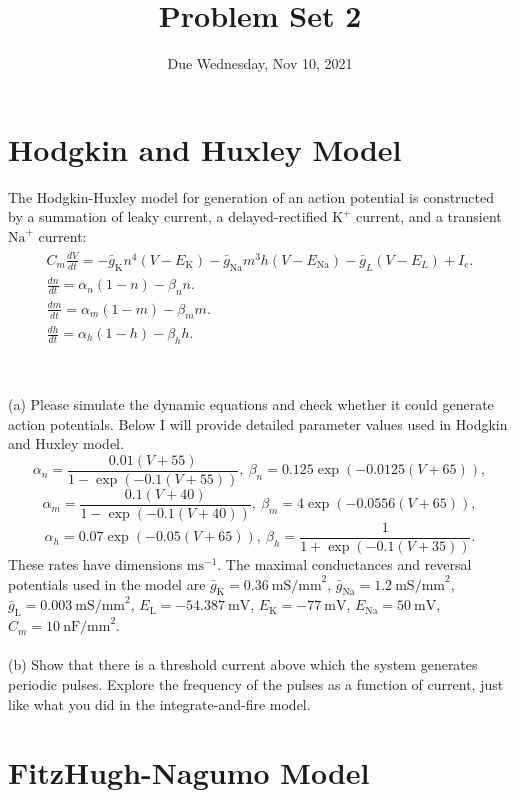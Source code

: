 \documentclass{article}
\title{Problem Set 2}
\date{Due Wednesday, Nov 10, 2021}
\begin{document}
\maketitle


\section*{Hodgkin and Huxley Model}

The Hodgkin-Huxley model for generation of an action potential is constructed by a summation of leaky current, a delayed-rectified $\textrm{K}^{+}$ current, and a transient $\textrm{Na}^{+}$ current:
\begin{eqnarray}
\begin{aligned}
C_{m}\frac{dV}{dt}=-\bar{g}_{\textrm{K}}n^{4}(V-E_{\textrm{K}})-\bar{g}_{\textrm{Na}}m^{3}h(V-E_{\textrm{Na}})-\bar{g}_L(V-E_L)+I_{e}.  \\  
\frac{dn}{dt}=\alpha_n (1-n) - \beta_n n. \\
\frac{dm}{dt}=\alpha_m(1-m) - \beta_m m. \\
\frac{dh}{dt}=\alpha_h(1-h) - \beta_h h. \\
\end{aligned}
\end{eqnarray}
\\
\\
(a) Please simulate the dynamic equations and check whether it could generate action potentials. Below I will provide detailed parameter values used in Hodgkin and Huxley model. 
\[\alpha_n=\frac{0.01(V+55)}{1-\exp(-0.1(V+55))}, \ \beta_n=0.125\exp(-0.0125(V+65)),\]
\[\alpha_m=\frac{0.1(V+40)}{1-\exp(-0.1(V+40))},\ \beta_m=4\exp(-0.0556(V+65)),\]
\[\alpha_h=0.07\exp(-0.05(V+65)), \ \beta_h=\frac{1}{1+\exp(-0.1(V+35))}. \]
These rates have dimensions $\textrm{ms}^{-1}$. The maximal conductances and reversal potentials used in the model are $\bar{g}_{\textrm{K}} = 0.36\  \textrm{mS/mm}^2$, $\bar{g}_{\textrm{Na}} = 1.2\  \textrm{mS/mm}^2$,   $\bar{g}_{\textrm{L}} = 0.003\  \textrm{mS/mm}^2$, $E_\textrm{L} = -54.387\  \textrm{mV}$, $E_\textrm{K} = -77\  \textrm{mV}$, $E_\textrm{Na} = 50\  \textrm{mV}$, $C_m = 10\ \textrm{nF/mm}^2$.
\\
\\
(b) Show that there is a threshold current above which the system generates periodic pulses. Explore the frequency of the pulses as a function of current, just like what you did in the integrate-and-fire model.

\section*{FitzHugh-Nagumo Model}
\end{document}
